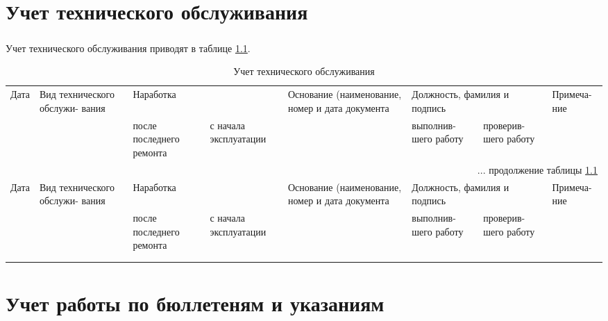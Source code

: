 \chapter{Учет технического обслуживания}

\paragraph{} Учет технического обслуживания приводят в таблице \ref{tab:service}.
	
	\begin{small}
	\begin{longtable}{|p{1cm}|p{2cm}|p{1.5cm}|p{1.5cm}|p{2.2cm}|p{2cm}|p{2cm}|p{2cm}|}
		\caption{\label{tab:service} Учет технического обслуживания}\\ 
		
		\hline
	\multirow{2}{1cm}{Дата} & \multirow{2}{2cm}{Вид технического обслужи- вания} & \multicolumn{2}{p{3cm}|}{Наработка} & \multirow{2}{2.2cm}{Основание (наименование, номер и дата документа} & \multicolumn{2}{p{4cm}|}{Должность, фамилия и подпись} & \multirow{2}{2cm}{Примеча- ние} \\ \cline{3-4} \cline{6-7}
	&  & после последнего ремонта & с начала эксплуатации &  & выполнив- шего работу & проверив- шего работу &  \\ \hline
		\endfirsthead
		
		\multicolumn{8}{r}{... продолжение таблицы \ref{tab:service}}\\ %
		\hline
	\multirow{2}{1cm}{Дата} & \multirow{2}{2cm}{Вид технического обслужи- вания} & \multicolumn{2}{p{3cm}|}{Наработка} & \multirow{2}{2.2cm}{Основание (наименование, номер и дата документа} & \multicolumn{2}{p{4cm}|}{Должность, фамилия и подпись} & \multirow{2}{2cm}{Примеча- ние} \\ \cline{3-4} \cline{6-7}
	&  & после последнего ремонта & с начала эксплуатации &  & выполнив- шего работу & проверив- шего работу &  \\ \hline
		\endhead
		
		\hline
		\rule{0cm}{18cm}& & & & & & & \\
		\hline
		\rule{0cm}{20cm}& & & & & & & \\
		\hline		
	\end{longtable}
	\end{small}




\chapter{Учет работы по бюллетеням и указаниям}

